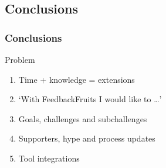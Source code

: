 \subsection{Conclusions}
\begin{frame}\frametitle{Conclusions}
    \begin{block}{Problem}
	\end{block}
	
	\begin{enumerate}
	    \item Time + knowledge = extensions
	    \item `With FeedbackFruits I would like to \ldots'
	    \item Goals, challenges and subchallenges
	    \item Supporters, hype and process updates
	    \item Tool integrations
	\end{enumerate}
\end{frame}



